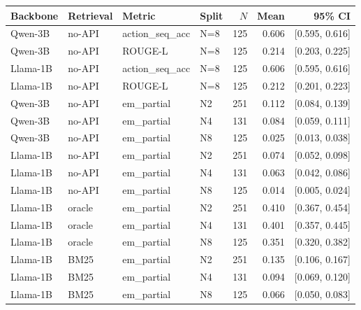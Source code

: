 \begin{tabular}{llllrrr}
\toprule
Backbone & Retrieval & Metric & Split & $N$ & Mean & 95\% CI \\
\midrule
Qwen-3B & no-API & action\_seq\_acc & N=8 & 125 & 0.606 & [0.595, 0.616] \\
Qwen-3B & no-API & ROUGE-L & N=8 & 125 & 0.214 & [0.203, 0.225] \\
Llama-1B & no-API & action\_seq\_acc & N=8 & 125 & 0.606 & [0.595, 0.616] \\
Llama-1B & no-API & ROUGE-L & N=8 & 125 & 0.212 & [0.201, 0.223] \\
Qwen-3B & no-API & em\_partial & N2 & 251 & 0.112 & [0.084, 0.139] \\
Qwen-3B & no-API & em\_partial & N4 & 131 & 0.084 & [0.059, 0.111] \\
Qwen-3B & no-API & em\_partial & N8 & 125 & 0.025 & [0.013, 0.038] \\
Llama-1B & no-API & em\_partial & N2 & 251 & 0.074 & [0.052, 0.098] \\
Llama-1B & no-API & em\_partial & N4 & 131 & 0.063 & [0.042, 0.086] \\
Llama-1B & no-API & em\_partial & N8 & 125 & 0.014 & [0.005, 0.024] \\
Llama-1B & oracle & em\_partial & N2 & 251 & 0.410 & [0.367, 0.454] \\
Llama-1B & oracle & em\_partial & N4 & 131 & 0.401 & [0.357, 0.445] \\
Llama-1B & oracle & em\_partial & N8 & 125 & 0.351 & [0.320, 0.382] \\
Llama-1B & BM25 & em\_partial & N2 & 251 & 0.135 & [0.106, 0.167] \\
Llama-1B & BM25 & em\_partial & N4 & 131 & 0.094 & [0.069, 0.120] \\
Llama-1B & BM25 & em\_partial & N8 & 125 & 0.066 & [0.050, 0.083] \\
\bottomrule
\end{tabular}
